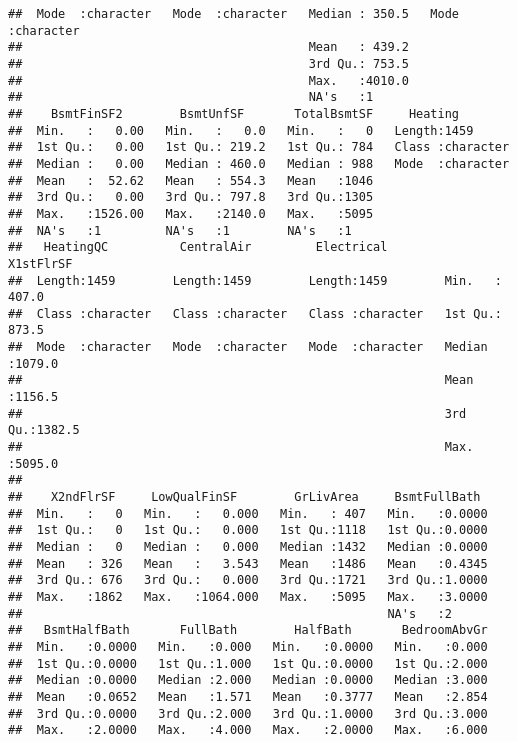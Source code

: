 \documentclass[
]{article}
\begin{document}
\begin{verbatim}
##  Mode  :character   Mode  :character   Median : 350.5   Mode  :character  
##                                        Mean   : 439.2                     
##                                        3rd Qu.: 753.5                     
##                                        Max.   :4010.0                     
##                                        NA's   :1                          
##    BsmtFinSF2        BsmtUnfSF       TotalBsmtSF     Heating         
##  Min.   :   0.00   Min.   :   0.0   Min.   :   0   Length:1459       
##  1st Qu.:   0.00   1st Qu.: 219.2   1st Qu.: 784   Class :character  
##  Median :   0.00   Median : 460.0   Median : 988   Mode  :character  
##  Mean   :  52.62   Mean   : 554.3   Mean   :1046                     
##  3rd Qu.:   0.00   3rd Qu.: 797.8   3rd Qu.:1305                     
##  Max.   :1526.00   Max.   :2140.0   Max.   :5095                     
##  NA's   :1         NA's   :1        NA's   :1                        
##   HeatingQC          CentralAir         Electrical          X1stFlrSF     
##  Length:1459        Length:1459        Length:1459        Min.   : 407.0  
##  Class :character   Class :character   Class :character   1st Qu.: 873.5  
##  Mode  :character   Mode  :character   Mode  :character   Median :1079.0  
##                                                           Mean   :1156.5  
##                                                           3rd Qu.:1382.5  
##                                                           Max.   :5095.0  
##                                                                           
##    X2ndFlrSF     LowQualFinSF        GrLivArea     BsmtFullBath   
##  Min.   :   0   Min.   :   0.000   Min.   : 407   Min.   :0.0000  
##  1st Qu.:   0   1st Qu.:   0.000   1st Qu.:1118   1st Qu.:0.0000  
##  Median :   0   Median :   0.000   Median :1432   Median :0.0000  
##  Mean   : 326   Mean   :   3.543   Mean   :1486   Mean   :0.4345  
##  3rd Qu.: 676   3rd Qu.:   0.000   3rd Qu.:1721   3rd Qu.:1.0000  
##  Max.   :1862   Max.   :1064.000   Max.   :5095   Max.   :3.0000  
##                                                   NA's   :2       
##   BsmtHalfBath       FullBath        HalfBath       BedroomAbvGr  
##  Min.   :0.0000   Min.   :0.000   Min.   :0.0000   Min.   :0.000  
##  1st Qu.:0.0000   1st Qu.:1.000   1st Qu.:0.0000   1st Qu.:2.000  
##  Median :0.0000   Median :2.000   Median :0.0000   Median :3.000  
##  Mean   :0.0652   Mean   :1.571   Mean   :0.3777   Mean   :2.854  
##  3rd Qu.:0.0000   3rd Qu.:2.000   3rd Qu.:1.0000   3rd Qu.:3.000  
##  Max.   :2.0000   Max.   :4.000   Max.   :2.0000   Max.   :6.000  

\end{verbatim}
\end{document}
